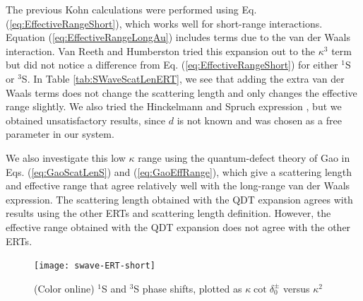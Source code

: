 \documentclass[preprint,showpacs,preprintnumbers,amsmath,amssymb,longbibliography,pra,aps]{revtex4-1}
\begin{document}
The previous Kohn calculations \cite{VanReeth2003} were performed using Eq. (\ref{eq:EffectiveRangeShort}), which works well for short-range interactions. Equation (\ref{eq:EffectiveRangeLongAu}) includes terms due to the van der Waals interaction. Van Reeth and Humberston \cite{VanReeth2003} tried this expansion out to the $\kappa^3$ term but did not notice a difference from Eq. (\ref{eq:EffectiveRangeShort}) for either $^1$S or $^3$S. In Table \ref{tab:SWaveScatLenERT}, we see that adding the extra van der Waals terms does not change the scattering length and only changes the effective range slightly. We also tried the Hinckelmann and Spruch expression \cite{Hinckelmann1971}, but we obtained unsatisfactory results, since $d$ is not known and was chosen as a free parameter in our system.

We also investigate this low $\kappa$ range using the quantum-defect theory of Gao \cite{Gao1998} in Eqs. (\ref{eq:GaoScatLenS}) and (\ref{eq:GaoEffRange}), which give a scattering length and effective range that agree relatively well with the long-range van der Waals expression. The scattering length obtained with the QDT expansion agrees with results using the other ERTs and scattering length definition. However, the effective range obtained with the QDT expansion does not agree with the other ERTs.

\begin{figure}[H]
	\centering
	\texttt{[image: swave-ERT-short]}
	\caption{(Color online) $^1$S and $^3$S phase shifts, plotted as $\kappa \cot \delta_0^\pm$ versus $\kappa^2$}
	\label{fig:swave-ERT-short}
\end{figure}
\end{document}
